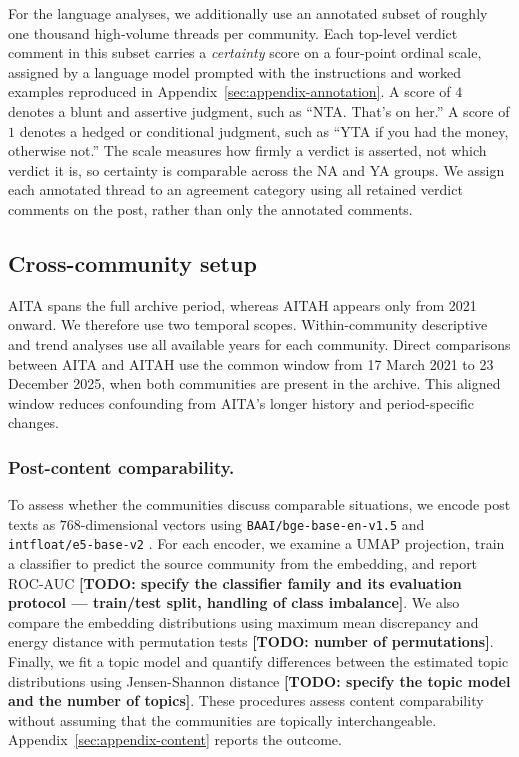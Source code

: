 For the language analyses, we additionally use an annotated subset of roughly
one thousand high-volume threads per community. Each top-level verdict comment
in this subset carries a \emph{certainty} score on a four-point ordinal scale,
assigned by a language model prompted with the instructions and worked examples
reproduced in Appendix~\ref{sec:appendix-annotation}. A score of $4$ denotes a
blunt and assertive judgment, such as ``NTA. That's on her.'' A score of $1$
denotes a hedged or conditional judgment, such as ``YTA if you had the money,
otherwise not.'' The scale measures how firmly a verdict is asserted, not which
verdict it is, so certainty is comparable across the NA and YA groups. We
assign each annotated thread to an agreement category using all retained verdict
comments on the post, rather than only the annotated comments.

\subsection*{Cross-community setup}

AITA spans the full archive period, whereas AITAH appears only from 2021 onward.
We therefore use two temporal scopes. Within-community descriptive and trend
analyses use all available years for each community. Direct comparisons between
AITA and AITAH use the common window from 17 March 2021 to 23 December 2025,
when both communities are present in the archive. This aligned window reduces
confounding from AITA's longer history and period-specific changes.

\subsubsection{Post-content comparability.}
To assess whether the communities discuss comparable situations, we encode post
texts as $768$-dimensional vectors using
\texttt{BAAI/bge-base-en-v1.5} \citep{bge_embedding} and
\texttt{intfloat/e5-base-v2} \citep{wang2022text}.
For each encoder, we examine a UMAP projection, train a classifier to predict
the source community from the embedding, and report ROC-AUC
\textbf{[TODO: specify the classifier family and its evaluation protocol ---
train/test split, handling of class imbalance]}. We also compare
the embedding distributions using maximum mean discrepancy and energy distance
with permutation tests \textbf{[TODO: number of permutations]}. Finally, we fit
a topic model and quantify differences between the estimated topic
distributions using Jensen-Shannon distance
\textbf{[TODO: specify the topic model and the number of topics]}. These procedures
assess content comparability without assuming that the communities are
topically interchangeable. Appendix~\ref{sec:appendix-content} reports the outcome.

